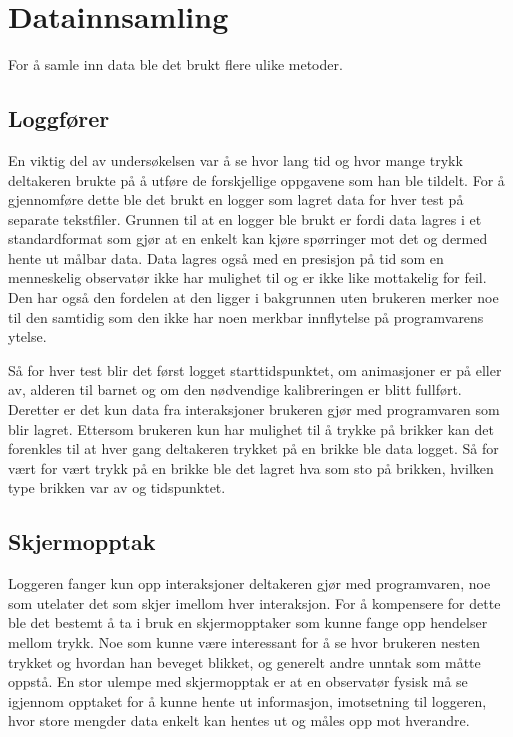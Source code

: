 \section{Datainnsamling}

For å samle inn data ble det brukt flere ulike metoder. 

\subsection{Loggfører}
En viktig del av undersøkelsen var å se hvor lang tid og hvor mange trykk deltakeren brukte på å utføre de forskjellige oppgavene som han ble tildelt. For å gjennomføre dette ble det brukt en logger som lagret data for hver test på separate tekstfiler. Grunnen til at en logger ble brukt er fordi data lagres i et standardformat som gjør at en enkelt kan kjøre spørringer mot det og dermed hente ut målbar data. Data lagres også med en presisjon på tid som en menneskelig observatør ikke har mulighet til og er ikke like mottakelig for feil. Den har også den fordelen at den ligger i bakgrunnen uten brukeren merker noe til den samtidig som den ikke har noen merkbar innflytelse på programvarens ytelse.

Så for hver test blir det først logget starttidspunktet, om animasjoner er på eller av, alderen til barnet og om den nødvendige kalibreringen er blitt fullført. Deretter er det kun data fra interaksjoner brukeren gjør med programvaren som blir lagret. Ettersom brukeren kun har mulighet til å trykke på brikker kan det forenkles til at hver gang deltakeren trykket på en brikke ble data logget. Så for vært for vært trykk på en brikke ble det lagret hva som sto på brikken, hvilken type brikken var av og tidspunktet.


\subsection{Skjermopptak}

Loggeren fanger kun opp interaksjoner deltakeren gjør med programvaren, noe som utelater det som skjer imellom hver interaksjon. For å kompensere for dette ble det bestemt å ta i bruk en skjermopptaker som kunne fange opp hendelser mellom trykk. Noe som kunne være interessant for å se hvor brukeren nesten trykket og hvordan han beveget blikket, og generelt andre unntak som måtte oppstå. En stor ulempe med skjermopptak er at en observatør fysisk må se igjennom opptaket for å kunne hente ut informasjon, imotsetning til loggeren, hvor store mengder data enkelt kan hentes ut og måles opp mot hverandre.

